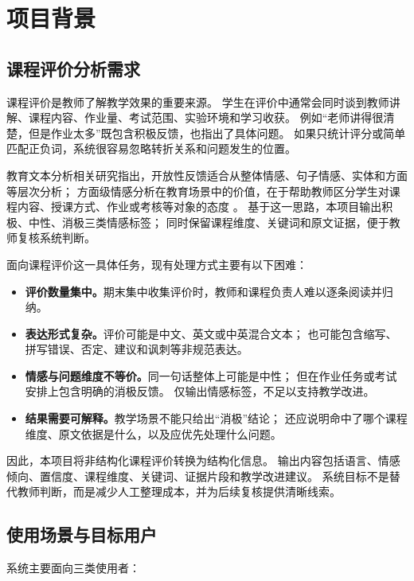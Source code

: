\section{项目背景}

\subsection{课程评价分析需求}

课程评价是教师了解教学效果的重要来源。
学生在评价中通常会同时谈到教师讲解、课程内容、作业量、考试范围、实验环境和学习收获。
例如“老师讲得很清楚，但是作业太多”既包含积极反馈，也指出了具体问题。
如果只统计评分或简单匹配正负词，系统很容易忽略转折关系和问题发生的位置。

教育文本分析相关研究指出，开放性反馈适合从整体情感、句子情感、实体和方面等层次分析；
方面级情感分析在教育场景中的价值，在于帮助教师区分学生对课程内容、授课方式、作业或考核等对象的态度
\citep{shaik2023educational,hajrizi2020aspect}。
基于这一思路，本项目输出积极、中性、消极三类情感标签；
同时保留课程维度、关键词和原文证据，便于教师复核系统判断。

面向课程评价这一具体任务，现有处理方式主要有以下困难：

\begin{itemize}
  \item \textbf{评价数量集中。}期末集中收集评价时，教师和课程负责人难以逐条阅读并归纳。
  \item \textbf{表达形式复杂。}评价可能是中文、英文或中英混合文本；
        也可能包含缩写、拼写错误、否定、建议和讽刺等非规范表达。
  \item \textbf{情感与问题维度不等价。}同一句话整体上可能是中性；
        但在作业任务或考试安排上包含明确的消极反馈。
        仅输出情感标签，不足以支持教学改进。
  \item \textbf{结果需要可解释。}教学场景不能只给出“消极”结论；
        还应说明命中了哪个课程维度、原文依据是什么，以及应优先处理什么问题。
\end{itemize}

因此，本项目将非结构化课程评价转换为结构化信息。
输出内容包括语言、情感倾向、置信度、课程维度、关键词、证据片段和教学改进建议。
系统目标不是替代教师判断，而是减少人工整理成本，并为后续复核提供清晰线索。

\subsection{使用场景与目标用户}

系统主要面向三类使用者：

